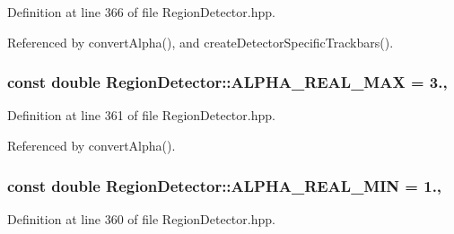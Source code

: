 Definition at line 366 of file Region\-Detector.\-hpp.



Referenced by convert\-Alpha(), and create\-Detector\-Specific\-Trackbars().

\hypertarget{classmultiscale_1_1analysis_1_1RegionDetector_abc853d2cfef9e4fafbf86715b48495e0}{
\subsubsection[{A\-L\-P\-H\-A\-\_\-\-R\-E\-A\-L\-\_\-\-M\-A\-X}]{\setlength{\rightskip}{0pt plus 5cm}const double Region\-Detector\-::\-A\-L\-P\-H\-A\-\_\-\-R\-E\-A\-L\-\_\-\-M\-A\-X = 3.\hspace{0.3cm}{\ttfamily [static]}, {\ttfamily [private]}}}\label{classmultiscale_1_1analysis_1_1RegionDetector_abc853d2cfef9e4fafbf86715b48495e0}


Definition at line 361 of file Region\-Detector.\-hpp.



Referenced by convert\-Alpha().

\hypertarget{classmultiscale_1_1analysis_1_1RegionDetector_a4a11aa86a5250ca6197589c4ccb770f6}{
\subsubsection[{A\-L\-P\-H\-A\-\_\-\-R\-E\-A\-L\-\_\-\-M\-I\-N}]{\setlength{\rightskip}{0pt plus 5cm}const double Region\-Detector\-::\-A\-L\-P\-H\-A\-\_\-\-R\-E\-A\-L\-\_\-\-M\-I\-N = 1.\hspace{0.3cm}{\ttfamily [static]}, {\ttfamily [private]}}}\label{classmultiscale_1_1analysis_1_1RegionDetector_a4a11aa86a5250ca6197589c4ccb770f6}


Definition at line 360 of file Region\-Detector.\-hpp.



